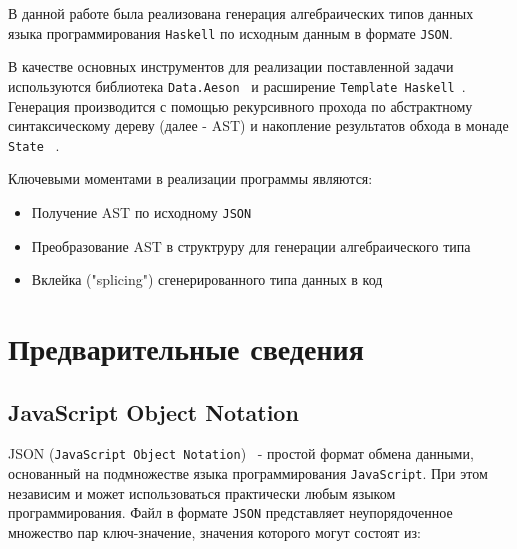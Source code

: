 


\graphicspath{ {img/} }




\Intro
В данной работе была реализована генерация алгебраических типов данных языка программирования \lstinline{Haskell} 
по исходным данным в формате \lstinline{JSON}.

В качестве основных инструментов для реализации поставленной задачи используются 
библиотека \lstinline{Data.Aeson}~\cite{aeson} и расширение \lstinline{Template Haskell}~\cite{tempHaskell}. Генерация 
производится с помощью рекурсивного прохода по абстрактному синтаксическому дереву (далее - AST) и 
накопление результатов обхода в монаде \lstinline{State} ~\cite{stateM}.

Ключевыми моментами в реализации программы являются:

\begin{itemize}
  \item Получение AST по исходному \lstinline{JSON}
  \item Преобразование AST в структруру для генерации алгебраического типа  
  \item Вклейка ("splicing") сгенерированного типа данных в код
\end{itemize}

\chapter{Предварительные сведения}

\section{JavaScript Object Notation}

JSON (\lstinline{JavaScript Object Notation})~\cite{jsonStandart} - простой формат обмена данными, основанный на подмножестве языка программирования \lstinline{JavaScript}. При этом независим и может использоваться практически любым языком программирования. Файл в формате \lstinline{JSON} представляет неупорядоченное множество пар ключ-значение, значения которого могут состоят из:  

